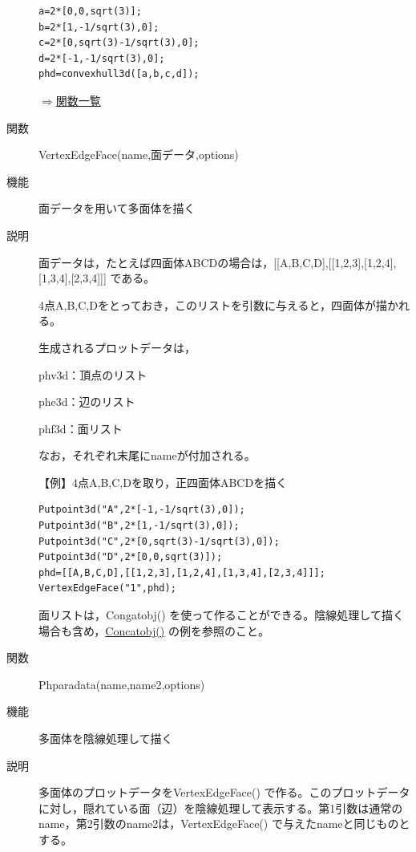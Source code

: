 \documentclass[papersize,a4paper,12pt,uplatex]{jsarticle}
\begin{document}
\begin{description}
\begin{verbatim}
a=2*[0,0,sqrt(3)];
b=2*[1,-1/sqrt(3),0];
c=2*[0,sqrt(3)-1/sqrt(3),0];
d=2*[-1,-1/sqrt(3),0];
phd=convexhull3d([a,b,c,d]);
\end{verbatim}

\begin{flushright} \hyperlink{functionlist}{$\Rightarrow$関数一覧}\end{flushright}
\hypertarget{vertexedgeface}{}
\item[関数]VertexEdgeFace(name,面データ,options)
\item[機能]面データを用いて多面体を描く
\item[説明]面データは，たとえば四面体ABCDの場合は，[[A,B,C,D],[[1,2,3],[1,2,4],[1,3,4],[2,3,4]]] である。

4点A,B,C,Dをとっておき，このリストを引数に与えると，四面体が描かれる。

生成されるプロットデータは，

phv3d：頂点のリスト

phe3d：辺のリスト

phf3d：面リスト

なお，それぞれ末尾にnameが付加される。

\vspace{\baselineskip}
【例】4点A,B,C,Dを取り，正四面体ABCDを描く
\begin{verbatim}
Putpoint3d("A",2*[-1,-1/sqrt(3),0]);
Putpoint3d("B",2*[1,-1/sqrt(3),0]);
Putpoint3d("C",2*[0,sqrt(3)-1/sqrt(3),0]);
Putpoint3d("D",2*[0,0,sqrt(3)]);
phd=[[A,B,C,D],[[1,2,3],[1,2,4],[1,3,4],[2,3,4]]];
VertexEdgeFace("1",phd);
\end{verbatim}
 \begin{center}  \end{center}
面リストは，Congatobj() を使って作ることができる。陰線処理して描く場合も含め，\hyperlink{concatobj}{Concatobj()} の例を参照のこと。

\vspace{\baselineskip}
\hypertarget{phparadata}{}
\item[関数]Phparadata(name,name2,options)
\item[機能]多面体を陰線処理して描く
\item[説明]多面体のプロットデータをVertexEdgeFace() で作る。このプロットデータに対し，隠れている面（辺）を陰線処理して表示する。第1引数は通常のname，第2引数のname2は，VertexEdgeFace() で与えたnameと同じものとする。


\end{description}
\end{document}
